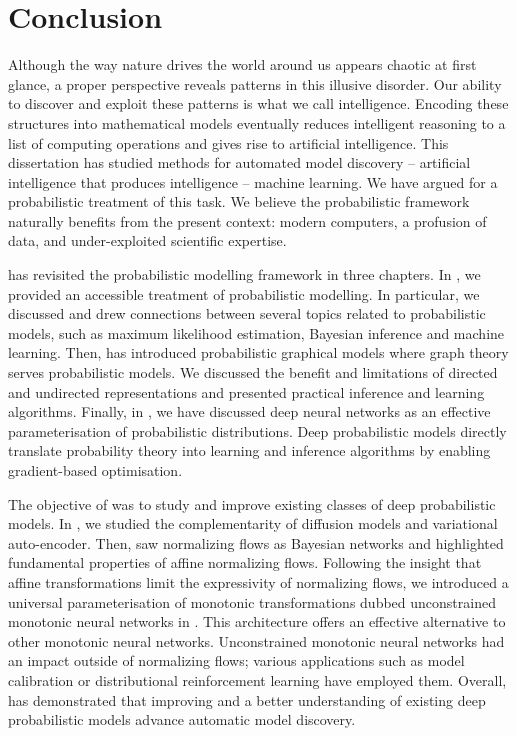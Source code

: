 \chapter{Conclusion}\label{ch:08}
Although the way nature drives the world around us appears chaotic at first glance, a proper perspective reveals patterns in this illusive disorder. Our ability to discover and exploit these patterns is what we call intelligence. Encoding these structures into mathematical models eventually reduces intelligent reasoning to a list of computing operations and gives rise to artificial intelligence. This dissertation has studied methods for automated model discovery -- artificial intelligence that produces intelligence -- machine learning. We have argued for a probabilistic treatment of this task. We believe the probabilistic framework naturally benefits from the present context: modern computers, a profusion of data, and under-exploited scientific expertise.

 has revisited the probabilistic modelling framework in three chapters. In , we provided an accessible treatment of probabilistic modelling. In particular, we discussed and drew connections between several topics related to probabilistic models, such as maximum likelihood estimation, Bayesian inference and machine learning. Then,  has introduced probabilistic graphical models where graph theory serves probabilistic models. We discussed the benefit and limitations of directed and undirected representations and presented practical inference and learning algorithms. Finally, in , we have discussed deep neural networks as an effective parameterisation of probabilistic distributions. Deep probabilistic models directly translate probability theory into learning and inference algorithms by enabling gradient-based optimisation.

The objective of  was to study and improve existing classes of deep probabilistic models. In , we studied the complementarity of diffusion models and variational auto-encoder. Then,  saw normalizing flows as Bayesian networks and highlighted fundamental properties of affine normalizing flows. Following the insight that affine transformations limit the expressivity of normalizing flows, we introduced a universal parameterisation of monotonic transformations dubbed unconstrained monotonic neural networks in . This architecture offers an effective alternative to other monotonic neural networks. Unconstrained monotonic neural networks had an impact outside of normalizing flows; various applications such as model calibration or distributional reinforcement learning have employed them. Overall,  has demonstrated that improving and a better understanding of existing deep probabilistic models advance automatic model discovery.

